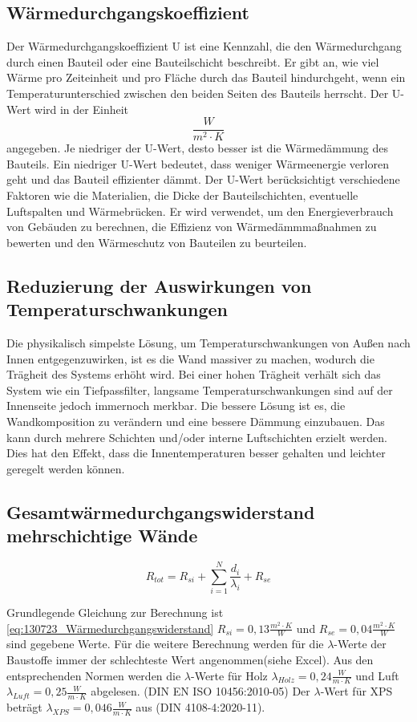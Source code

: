 \subsection{Wärmedurchgangskoeffizient}
Der Wärmedurchgangskoeffizient U ist eine Kennzahl, die den Wärmedurchgang durch einen Bauteil oder eine Bauteilschicht beschreibt. 
Er gibt an, wie viel Wärme pro Zeiteinheit und pro Fläche durch das Bauteil hindurchgeht, wenn ein Temperaturunterschied zwischen den beiden Seiten des Bauteils herrscht.
Der U-Wert wird in der Einheit $$\frac{W}{m^2 \cdot K}$$ angegeben. Je niedriger der U-Wert, desto besser ist die Wärmedämmung des Bauteils. 
Ein niedriger U-Wert bedeutet, dass weniger Wärmeenergie verloren geht und das Bauteil effizienter dämmt.
Der U-Wert berücksichtigt verschiedene Faktoren wie die Materialien, die Dicke der Bauteilschichten, eventuelle Luftspalten und Wärmebrücken. 
Er wird verwendet, um den Energieverbrauch von Gebäuden zu berechnen, die Effizienz von Wärmedämmmaßnahmen zu bewerten und den Wärmeschutz von Bauteilen zu beurteilen.

\subsection{Reduzierung der Auswirkungen von Temperaturschwankungen}

Die physikalisch simpelste Lösung, um Temperaturschwankungen von Außen nach Innen entgegenzuwirken, ist es die Wand massiver zu machen, wodurch die Trägheit des Systems erhöht wird.
Bei einer hohen Trägheit verhält sich das System wie ein Tiefpassfilter, langsame Temperaturschwankungen sind auf der Innenseite jedoch immernoch merkbar.
Die bessere Lösung ist es, die Wandkomposition zu verändern und eine bessere Dämmung einzubauen.
Das kann durch mehrere Schichten und/oder interne Luftschichten erzielt werden.
Dies hat den Effekt, dass die Innentemperaturen besser gehalten und leichter geregelt werden können.

\subsection{Gesamtwärmedurchgangswiderstand mehrschichtige Wände}
\begin{equation}
	\label{eq:130723_Wärmedurchgangswiderstand}
	R_{tot}=R_{si}+\sum_{i=1}^N \frac{d_i}{\lambda_i}+R_{se}
\end{equation}

Grundlegende Gleichung zur Berechnung ist \autoref{eq:130723_Wärmedurchgangswiderstand} $R_{si}=0,13\frac{m^2 \cdot K}{W}$ und $R_{se}=0,04\frac{m^2 \cdot K}{W}$ sind gegebene Werte.
Für die weitere Berechnung werden für die $\lambda$-Werte der Baustoffe immer der schlechteste Wert angenommen(siehe Excel). Aus den entsprechenden Normen werden
die $\lambda$-Werte für Holz \cite[S.20]{lamda-holz-luft} $\lambda_{Holz}=0,24\frac{W}{m\cdot K}$ und Luft\cite[S. 15]{lamda-holz-luft} $\lambda_{Luft}=0,25\frac{W}{m\cdot K}$ abgelesen. (DIN EN ISO 10456:2010-05)
Der $\lambda$-Wert für XPS \cite[S.23]{lamda-xps} beträgt $\lambda_{XPS}=0,046\frac{W}{m\cdot K}$ aus (DIN 4108-4:2020-11).

